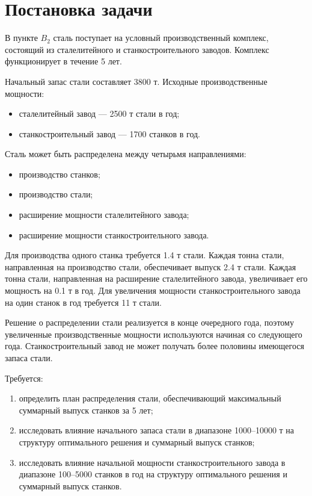 \documentclass[a4paper,12pt]{article}
\begin{document}
\section{Постановка задачи}
В пункте $B_2$ сталь поступает на условный производственный комплекс,
состоящий из сталелитейного и станкостроительного заводов. Комплекс
функционирует в течение 5 лет.

Начальный запас стали составляет 3800 т. Исходные производственные мощности:
\begin{itemize}
    \item сталелитейный завод --- 2500 т стали в год;
    \item станкостроительный завод --- 1700 станков в год.
\end{itemize}

Сталь может быть распределена между четырьмя направлениями:
\begin{itemize}
    \item производство станков;
    \item производство стали;
    \item расширение мощности сталелитейного завода;
    \item расширение мощности станкостроительного завода.
\end{itemize}

Для производства одного станка требуется 1.4 т стали. Каждая тонна стали,
направленная на производство стали, обеспечивает выпуск 2.4 т стали.
Каждая тонна стали, направленная на расширение сталелитейного завода,
увеличивает его мощность на 0.1 т в год. Для увеличения мощности
станкостроительного завода на один станок в год требуется 11 т стали.

Решение о распределении стали реализуется в конце очередного года, поэтому
увеличенные производственные мощности используются начиная со следующего года.
Станкостроительный завод не может получать более половины имеющегося запаса
стали.

Требуется:
\begin{enumerate}
    \item определить план распределения стали, обеспечивающий максимальный
    суммарный выпуск станков за 5 лет;
    \item исследовать влияние начального запаса стали в диапазоне 1000--10000 т
    на структуру оптимального решения и суммарный выпуск станков;
    \item исследовать влияние начальной мощности станкостроительного завода
    в диапазоне 100--5000 станков в год на структуру оптимального решения и
    суммарный выпуск станков.
\end{enumerate}
\end{document}
